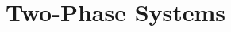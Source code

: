 \documentclass[10pt,compress,unknownkeysallowed]{beamer}
\begin{document}

\section{Two-Phase Systems}

\end{document}

